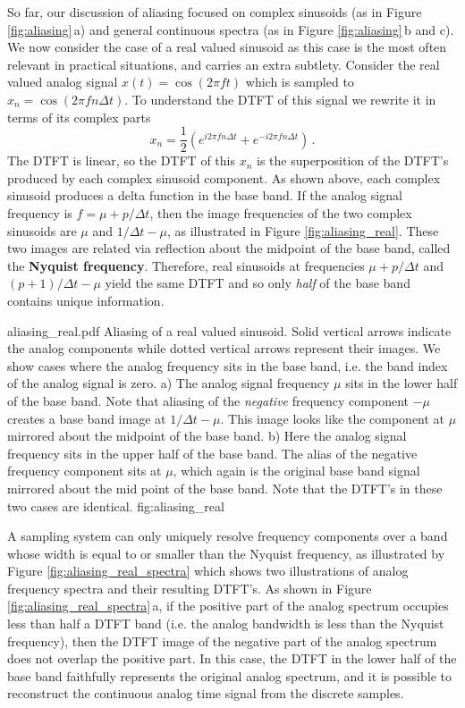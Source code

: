 \documentclass[twocolumn]{article}
\begin{document}
So far, our discussion of aliasing focused on complex sinusoids (as in Figure \ref{fig:aliasing}\,a) and general continuous spectra (as in Figure \ref{fig:aliasing}\,b and c).
We now consider the case of a real valued sinusoid as this case is the most often relevant in practical situations, and carries an extra subtlety.
Consider the real valued analog signal $x(t) = \cos(2 \pi f t)$ which is sampled to $x_n = \cos(2 \pi f n \Delta t)$.
To understand the DTFT of this signal we rewrite it in terms of its complex parts
\begin{equation}
x_n = \frac{1}{2} \left( e^{i 2 \pi f n \Delta t} + e^{-i 2 \pi f n \Delta t} \right) \, .
\end{equation}
The DTFT is linear, so the DTFT of this $x_n$ is the superposition of the DTFT's produced by each complex sinusoid component.
As shown above, each complex sinusoid produces a delta function in the base band.
If the analog signal frequency is $f = \mu + p/\Delta t$, then the image frequencies of the two complex sinusoids are $\mu$ and $1/\Delta t - \mu$, as illustrated in Figure \ref{fig:aliasing_real}.
These two images are related via reflection about the midpoint of the base band, called the \textbf{Nyquist frequency}.
Therefore, real sinusoids at frequencies $\mu + p/\Delta t$ and $(p+1)/\Delta t - \mu$ yield the same DTFT and so only \emph{half} of the base band contains unique information.

{aliasing_real.pdf}
{Aliasing of a real valued sinusoid.
Solid vertical arrows indicate the analog components while dotted vertical arrows represent their images.
We show cases where the analog frequency sits in the base band, i.e. the band index of the analog signal is zero.
a) The analog signal frequency $\mu$ sits in the lower half of the base band.
Note that aliasing of the \emph{negative} frequency component $-\mu$ creates a base band image at $1/\Delta t - \mu$.
This image looks like the component at $\mu$ mirrored about the midpoint of the base band.
b) Here the analog signal frequency sits in the upper half of the base band.
The alias of the negative frequency component sits at $\mu$, which again is the original base band signal mirrored about the mid point of the base band.
Note that the DTFT's in these two cases are identical.}
{fig:aliasing_real}

A sampling system can only uniquely resolve frequency components over a band whose width is equal to or smaller than the Nyquist frequency, as illustrated by Figure \ref{fig:aliasing_real_spectra} which shows two illustrations of analog frequency spectra and their resulting DTFT's.
As shown in Figure \ref{fig:aliasing_real_spectra}\,a, if the positive part of the analog spectrum occupies less than half a DTFT band (i.e. the analog bandwidth is less than the Nyquist frequency), then the DTFT image of the negative part of the analog spectrum does not overlap the positive part.
In this case, the DTFT in the lower half of the base band faithfully represents the original analog spectrum, and it is possible to reconstruct the continuous analog time signal from the discrete samples.
\end{document}
